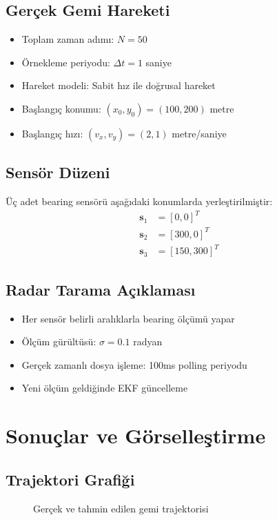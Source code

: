 \documentclass[12pt,a4paper]{article}
\begin{document}
\subsection{Gerçek Gemi Hareketi}
\begin{itemize}
    \item Toplam zaman adımı: $N = 50$
    \item Örnekleme periyodu: $\Delta t = 1$ saniye
    \item Hareket modeli: Sabit hız ile doğrusal hareket
    \item Başlangıç konumu: $(x_0, y_0) = (100, 200)$ metre
    \item Başlangıç hızı: $(v_x, v_y) = (2, 1)$ metre/saniye
\end{itemize}

\subsection{Sensör Düzeni}
Üç adet bearing sensörü aşağıdaki konumlarda yerleştirilmiştir:
\begin{align}
\mathbf{s}_1 &= [0, 0]^T \\
\mathbf{s}_2 &= [300, 0]^T \\
\mathbf{s}_3 &= [150, 300]^T
\end{align}

\subsection{Radar Tarama Açıklaması}
\begin{itemize}
    \item Her sensör belirli aralıklarla bearing ölçümü yapar
    \item Ölçüm gürültüsü: $\sigma = 0.1$ radyan
    \item Gerçek zamanlı dosya işleme: 100ms polling periyodu
    \item Yeni ölçüm geldiğinde EKF güncelleme
\end{itemize}

\section{Sonuçlar ve Görselleştirme}

\subsection{Trajektori Grafiği}
\begin{figure}[H]
    \centering
    \caption{Gerçek ve tahmin edilen gemi trajektorisi}
    \label{fig:trajectory}
\end{figure}
\end{document}
